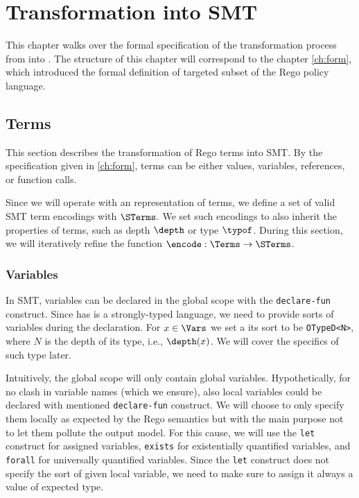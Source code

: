 \chapter{Transformation into SMT}
\label{ch:trans}

This chapter walks over the formal specification of the transformation process from \rego into \smtlib.
The structure of this chapter will correspond to the chapter \ref{ch:form}, which introduced the formal definition of targeted subset of the Rego policy language.

\section{Terms}

This section describes the transformation of Rego terms into SMT.
By the specification given in \ref{ch:form}, terms can be either values, variables, references, or function calls.

Since we will operate with an \smtlib representation of terms, we define a set of valid SMT term encodings with $\STerms$.
We set such encodings to also inherit the properties of terms, such as depth $\depth$ or type $\typof$.
During this section, we will iteratively refine the function $\encode: \Terms \to \STerms$.

\subsection{Variables}
\label{ss:vars:t}

In SMT, variables can be declared in the global scope with the \texttt{declare-fun} construct.
Since \smtlib has is a strongly-typed language, we need to provide sorts of variables during the declaration.
For $x \in \Vars$ we set a its sort to be \texttt{OTypeD<N>}, where $N$ is the depth of its type, i.e., $\depth(x)$.
We will cover the specifics of such type later.

Intuitively, the global scope will only contain global variables.
Hypothetically, for no clash in variable names (which we ensure), also local variables could be declared with mentioned \texttt{declare-fun} construct.
We will choose to only specify them locally as expected by the Rego semantics but with the main purpose not to let them pollute the output model.
For this cause, we will use the \texttt{let} construct for assigned variables, \texttt{exists} for existentially quantified variables, and \texttt{forall} for universally quantified variables.
Since the \texttt{let} construct does not specify the sort of given local variable, we need to make sure to assign it always a value of expected type.

